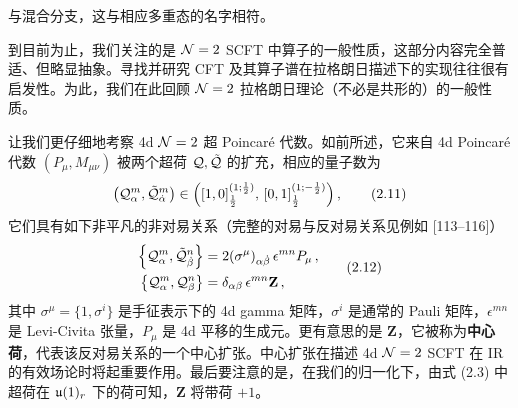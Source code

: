与混合分支，这与相应多重态的名字相符。


到目前为止，我们关注的是 $\mathcal{N}=2$ SCFT 中算子的一般性质，这部分内容完全普适、但略显抽象。寻找并研究 CFT 及其算子谱在拉格朗日描述下的实现往往很有启发性。为此，我们在此回顾 $\mathcal{N}=2$ 拉格朗日理论（不必是共形的）的一般性质。

让我们更仔细地考察 4d $\mathcal{N}=2$ 超 Poincaré 代数。如前所述，它来自 4d Poincaré 代数 $(P_\mu,M_{\mu\nu})$ 被两个超荷 $\mathcal{Q},\tilde{\mathcal{Q}}$ 的扩充，相应的量子数为
\begin{equation}
  \left(\mathcal{Q}^m_\alpha,\tilde{\mathcal{Q}}^m_{\dot\alpha}\right)\in
  \left([1,0]^{(1;\frac12)}_{\frac12},\,[0,1]^{(1;-\frac12)}_{\frac12}\right),
  \tag{2.11}
\end{equation}
它们具有如下非平凡的非对易关系（完整的对易与反对易关系见例如 [113--116]）
\begin{equation}
  \begin{aligned}
    \left\{\mathcal{Q}^m_\alpha,\tilde{\mathcal{Q}}^n_{\dot\beta}\right\}&=2(\sigma^\mu)_{\alpha\dot\beta}\,\epsilon^{mn}P_\mu\,,\\
    \left\{\mathcal{Q}^m_\alpha,\mathcal{Q}^n_\beta\right\}&=\delta_{\alpha\beta}\,\epsilon^{mn}\mathbf Z\,,
  \end{aligned}
  \tag{2.12}
\end{equation}
其中 $\sigma^\mu=\{1,\sigma^i\}$ 是手征表示下的 4d gamma 矩阵，$\sigma^i$ 是通常的 Pauli 矩阵，$\epsilon^{mn}$ 是 Levi-Civita 张量，$P_\mu$ 是 4d 平移的生成元。更有意思的是 $\mathbf Z$，它被称为\textbf{中心荷}，代表该反对易关系的一个中心扩张。中心扩张在描述 4d $\mathcal{N}=2$ SCFT 在 IR 的有效场论时将起重要作用。最后要注意的是，在我们的归一化下，由式 (2.3) 中超荷在 $\mathfrak{u}(1)_r$ 下的荷可知，$\mathbf Z$ 将带荷 $+1$。

